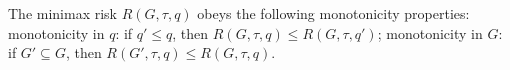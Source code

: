 The minimax risk \(R(G,\tau,q)\) obeys the following monotonicity properties: monotonicity in \(q\): if \(q'\leq q\), then \(R(G,\tau,q)\leq R(G,\tau,q')\); monotonicity in \(G\): if \(G'\subseteq G\), then \(R(G',\tau,q)\leq R(G,\tau,q)\).